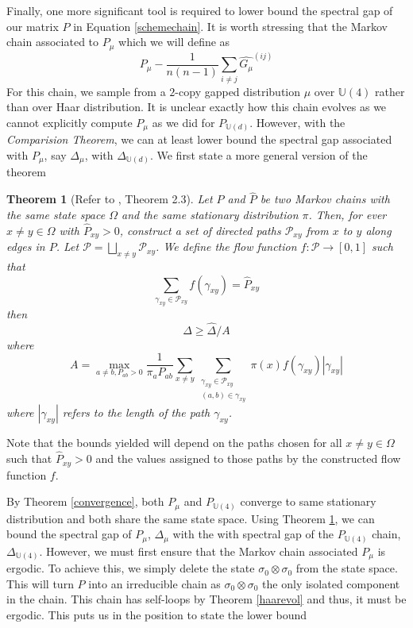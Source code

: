 \documentclass[12pt]{amsart}
\newtheorem{theorem}{Theorem}[section]
\theoremstyle{definition}
\theoremstyle{remark}
\numberwithin{equation}{section}
\theoremstyle{remark}
\begin{document}
Finally, one more significant tool is required to lower bound the spectral gap of our matrix $P$ in Equation \ref{schemechain}. It is worth stressing that the Markov chain associated to $P_{\mu}$ which we will define as
%
\begin{equation}
P_\mu - \frac{1}{n(n-1)}\sum_{i\neq j}\widehat{G_\mu}^{(ij)}
\end{equation}
For this chain, we sample from a $2$-copy gapped distribution $\mu $ over $\mathbb{U}(4)$ rather than over Haar distribution. It is unclear exactly how this chain evolves as we cannot explicitly compute $P_\mu$ as we did for $P_{\mathbb{U}(d)}$. However, with the \emph{Comparision Theorem}, we can at least lower bound the spectral gap associated with $P_\mu$, say $\Delta_\mu$, with $\Delta_{\mathbb{U}(d)}$. We first state a more general version of the theorem
%
\begin{theorem}[Refer to \cite{montenegro}, Theorem 2.3] \label{comptheorem}
  Let $P$ and $\widehat{P}$ be two Markov chains with the same state space $\Omega$ and the same stationary distribution $\pi$. Then, for ever $x \neq y \in \Omega$ with $\widehat{P}_{xy} > 0$, construct a set of directed paths $\mathcal{P}_{xy}$ from $x$ to $y$ along edges in $P$. Let $\mathcal{P} = \bigsqcup_{x\neq y} \mathcal{P}_{xy}$. We define the flow function $f: \mathcal{P} \rightarrow [0,1]$ such that
  \begin{equation}
    \sum_{\gamma_{xy} \in \mathcal{P}_{xy}} f(\gamma_{xy}) = \widehat{P}_{xy}
  \end{equation}
  then
  $$ \Delta \geq \widehat{\Delta}/A $$
  where
  $$ A = \max_{a \neq b, P_{ab} > 0}\frac{1}{\pi_aP_{ab}} \sum_{x \neq y}\sum_{
                          \substack {
                          \gamma_{xy} \in \mathcal{P}_{xy} \\
                          (a,b) \in \gamma_{xy}}}  \pi(x)f(\gamma_{xy})|\gamma_{xy}|$$
  where $|\gamma_{xy}|$ refers to the length of the path $\gamma_{xy}$.
\end{theorem}
\noindent Note that the bounds yielded will depend on the paths chosen for all $x \neq y \in \Omega$ such that $\widehat{P}_{xy} > 0$ and the values assigned to those paths by the constructed flow function $f$.
\newline

By Theorem \ref{convergence}, both $P_{\mu}$ and $P_{\mathbb{U}(4)}$ converge to same stationary distribution and both share the same state space. Using Theorem \ref{comptheorem}, we can bound the spectral gap of $P_\mu$, $\Delta_\mu$ with the with spectral gap of the $P_{\mathbb{U}(4)}$ chain, $\Delta_{\mathbb{U}(4)}$. However, we must first ensure that the Markov chain associated $P_\mu$ is ergodic. To achieve this, we simply delete the state $\sigma_0 \otimes \sigma_0$ from the state space.   This will turn $P$ into an irreducible chain as $\sigma_0 \otimes \sigma_0$ the only isolated component in the chain. This chain has self-loops by Theorem \ref{haarevol} and thus, it must be ergodic. This puts us in the position to state the lower bound
\end{document}
